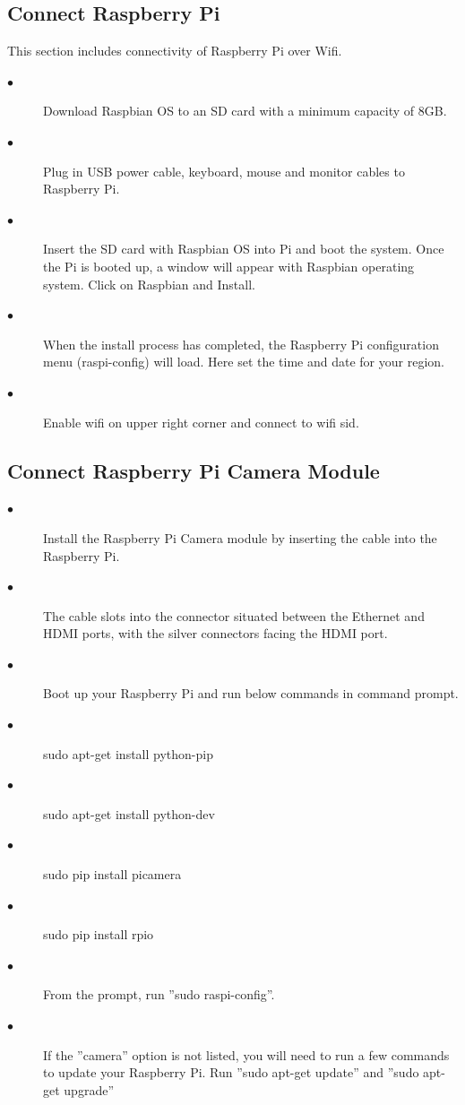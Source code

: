 \documentclass[sigconf]{acmart}
\begin{document}
\subsection{Connect Raspberry Pi}
This section includes connectivity of Raspberry Pi over Wifi. 
\begin{description}

    \item[$\bullet$] Download Raspbian OS to an SD card with a minimum capacity of 8GB.
    
    \item[$\bullet$] Plug in USB power cable, keyboard, mouse and monitor cables to Raspberry Pi.
    
    \item[$\bullet$] Insert the SD card with Raspbian OS into Pi and boot the system. Once the Pi is booted up, a window will appear with Raspbian operating system. Click on Raspbian and Install.
    
    \item[$\bullet$] When the install process has completed, the Raspberry Pi configuration menu (raspi-config) will load. Here  set the time and date for your region.
    
    \item[$\bullet$] Enable wifi on upper right corner and connect to wifi sid.
\end{description}

\subsection{Connect Raspberry Pi Camera Module}
\begin{description}
    \item[$\bullet$] Install the Raspberry Pi Camera module by inserting the cable into the Raspberry Pi.
    \item[$\bullet$] The cable slots into the connector situated between the Ethernet and HDMI ports, with the silver connectors facing the HDMI port.
    \item[$\bullet$] Boot up your Raspberry Pi and run below commands in command prompt.
    \item[$\bullet$] sudo apt-get install python-pip
    \item[$\bullet$] sudo apt-get install python-dev
    \item[$\bullet$] sudo pip install picamera
    \item[$\bullet$] sudo pip install rpio
    \item[$\bullet$] From the prompt, run ''sudo raspi-config''. 
    \item[$\bullet$] If the ''camera'' option is not listed, you will need to run a few commands to update your Raspberry Pi. Run ''sudo apt-get update'' and ''sudo apt-get upgrade''
\end{description}
\end{document}
